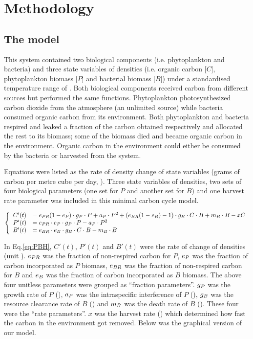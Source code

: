 \documentclass[../thesis.tex]{subfiles} %
\begin{document}
\section{Methodology}

\subsection{The model}

This system contained two biological components (i.e. phytoplankton and bacteria) and three state variables of densities (i.e. organic carbon [$C$], phytoplankton biomass [$P$] and bacterial biomass [$B$]) under a standardised temperature range of \temp.  Both biological components received carbon from different sources but performed the same functions. Phytoplankton photosynthesized carbon dioxide from the atmosphere (an unlimited source) while bacteria consumed organic carbon from its environment.  Both phytoplankton and bacteria respired and leaked a fraction of the carbon obtained respectively and allocated the rest to its biomass; some of the biomass died and became organic carbon in the environment.  Organic carbon in the environment could either be consumed by the bacteria or harvested from the system.

Equations were listed as the rate of density change of state variables (grams of carbon per metre cube per day, \dxdt).  Three state variables of densities, two sets of four biological parameters (one set for $P$ and another set for $B$) and one harvest rate parameter was included in this minimal carbon cycle model.

\begin{equation}\left\{\begin{array}{rl}
    C'(t) &= e_{PR}(1-e_P)\cdot g_P\cdot P +a_P\cdot P^2 +(e_{BR}(1-e_B)-1)\cdot g_B\cdot C\cdot B +m_B\cdot B -xC\\
    P'(t) &= e_{PR}\cdot e_P\cdot g_P\cdot P -a_P\cdot P^2\\
    B'(t) &= e_{BR}\cdot e_B\cdot g_B\cdot C\cdot B -m_B\cdot B
\end{array}\right.\label{eq:PBH}\end{equation}

In Eq.\ref{eq:PBH}, $C'(t)$, $P'(t)$ and $B'(t)$ were the rate of change of densities (unit \dxdt).  $e_{PR}$ was the fraction of non-respired carbon for $P$, $e_P$ was the fraction of carbon incorporated as $P$ biomass, $e_{BR}$ was the fraction of non-respired carbon for $B$ and $e_B$ was the fraction of carbon incorporated as $B$ biomass.  The above four unitless parameters were grouped as “fraction parameters”.  $g_P$ was the growth rate of $P$ (\dayU), $a_P$ was the intraspecific interference of $P$ (\denI), $g_B$ was the resource clearance rate of $B$  (\denI) and $m_B$ was the death rate of $B$ (\dayU).  These four were the “rate parameters”.  $x$ was the harvest rate (\dayU) which determined how fast the carbon in the environment got removed.  Below was the graphical version of our model.
\end{document}
